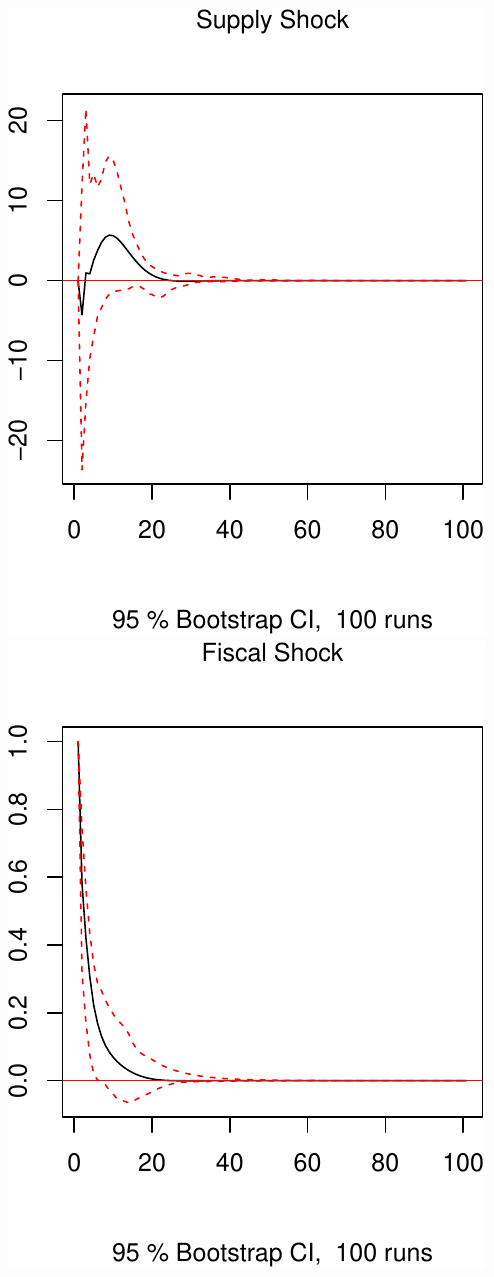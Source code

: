 \documentclass[11pt,preprint, authoryear]{elsarticle}
\numberwithin{equation}{section}
\numberwithin{figure}{section}
\numberwithin{table}{section}
\begin{document}
\includegraphics{TS_proj_files/figure-latex/unnamed-chunk-38-1.pdf}
\includegraphics{TS_proj_files/figure-latex/unnamed-chunk-38-2.pdf}
\end{document}
